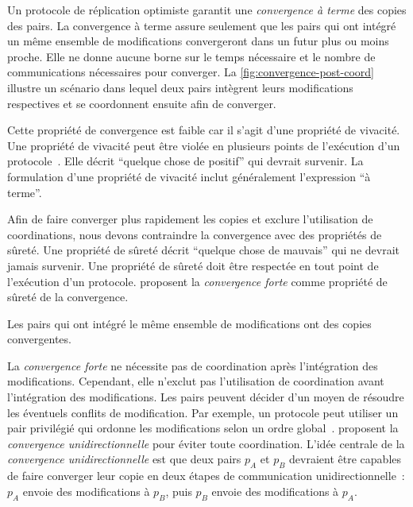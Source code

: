 Un protocole de réplication optimiste garantit une \emph{convergence à terme} des copies des pairs.
La convergence à terme assure seulement que les pairs qui ont intégré un même ensemble de modifications convergeront dans un futur plus ou moins proche.
Elle ne donne aucune borne sur le temps nécessaire et le nombre de communications nécessaires  pour converger.
La \autoref{fig:convergence-post-coord} illustre un scénario dans lequel deux pairs intègrent leurs modifications respectives et se coordonnent ensuite afin de converger.

Cette propriété de convergence est faible car il s'agit d'une propriété de vivacité.
Une propriété de vivacité peut être violée en plusieurs points de l'exécution d'un protocole~\autocite{alpern_liveness_1985}.
Elle décrit \enquote{quelque chose de positif} qui devrait survenir.
La formulation d'une propriété de vivacité inclut généralement l'expression \enquote{à terme}.

Afin de faire converger plus rapidement les copies et exclure l'utilisation de coordinations, nous devons contraindre la convergence avec des propriétés de sûreté.
Une propriété de sûreté décrit \enquote{quelque chose de mauvais} qui ne devrait jamais survenir.
Une propriété de sûreté doit être respectée en tout point de l'exécution d'un protocole.
\textcite{shapiro_2011_crdt} proposent la \emph{convergence forte} comme propriété de sûreté de la convergence.

\begin{definition}\label{def:strong-convergence}
Les pairs qui ont intégré le même ensemble de modifications ont des copies convergentes.
\end{definition}

La \emph{convergence forte} ne nécessite pas de coordination après l'intégration des modifications.
Cependant, elle n'exclut pas l'utilisation de coordination avant l'intégration des modifications.
Les pairs peuvent décider d'un moyen de résoudre les éventuels conflits de modification.
Par exemple, un protocole peut utiliser un pair privilégié qui ordonne les modifications selon un ordre global~\autocite{terry_bayou_1995}.
\textcite{mahajan_2011_cac} proposent la \emph{convergence unidirectionnelle} pour éviter toute coordination.
L'idée centrale de la \emph{convergence unidirectionnelle} est que deux pairs $p_A$ et $p_B$ devraient être capables de faire converger leur copie en deux étapes de communication unidirectionnelle~: $p_A$ envoie des modifications à $p_B$, puis $p_B$ envoie des modifications à $p_A$.

